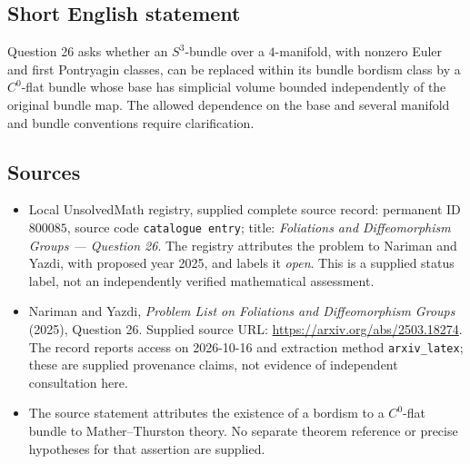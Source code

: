 \documentclass[11pt]{article}
\begin{document}
\subsection{Short English statement}
Question 26 asks whether an \(S^3\)-bundle over a \(4\)-manifold, with nonzero Euler and first Pontryagin classes, can be replaced within its bundle bordism class by a \(C^0\)-flat bundle whose base has simplicial volume bounded independently of the original bundle map. The allowed dependence on the base and several manifold and bundle conventions require clarification.
\subsection{Sources}
\begin{itemize}
\item Local UnsolvedMath registry, supplied complete source record: permanent ID \(800085\), source code \texttt{catalogue entry}; title: \emph{Foliations and Diffeomorphism Groups --- Question 26}. The registry attributes the problem to Nariman and Yazdi, with proposed year 2025, and labels it \emph{open}. This is a supplied status label, not an independently verified mathematical assessment.
\item Nariman and Yazdi, \emph{Problem List on Foliations and Diffeomorphism Groups} (2025), Question 26. Supplied source URL: \url{https://arxiv.org/abs/2503.18274}. The record reports access on 2026-10-16 and extraction method \texttt{arxiv\_latex}; these are supplied provenance claims, not evidence of independent consultation here.
\item The source statement attributes the existence of a bordism to a \(C^0\)-flat bundle to Mather--Thurston theory. No separate theorem reference or precise hypotheses for that assertion are supplied.
\end{itemize}
\end{document}
